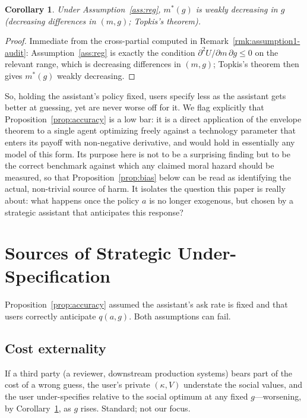 \documentclass[11pt]{article}
\newtheorem{corollary}{Corollary}
\begin{document}
\begin{corollary}\label{cor:mono}
Under Assumption~\ref{ass:reg}, $m^*(g)$ is weakly decreasing in $g$ (decreasing
differences in $(m,g)$; Topkis's theorem).
\end{corollary}

\begin{proof}
Immediate from the cross-partial computed in Remark~\ref{rmk:assumption1-audit}:
Assumption~\ref{ass:reg} is exactly the condition $\partial^2U/\partial m\,\partial g \le 0$
on the relevant range, which is decreasing differences in $(m,g)$; Topkis's
theorem then gives $m^*(g)$ weakly decreasing.
\end{proof}

So, holding the assistant's policy fixed, users specify less as the assistant gets
better at guessing, yet are never worse off for it. We flag explicitly that
Proposition~\ref{prop:accuracy} is a low bar: it is a direct application of the
envelope theorem to a single agent optimizing freely against a technology
parameter that enters its payoff with non-negative derivative, and would hold in
essentially any model of this form. Its purpose here is not to be a surprising
finding but to be the correct benchmark against which any claimed moral hazard
should be measured, so that Proposition~\ref{prop:bias} below can be read as
identifying the actual, non-trivial source of harm. It isolates the
question this paper is really about: what happens once the policy $a$ is no longer
exogenous, but chosen by a strategic assistant that anticipates this response?

\section{Sources of Strategic Under-Specification}

Proposition~\ref{prop:accuracy} assumed the assistant's ask rate is fixed and that
users correctly anticipate $q(a,g)$. Both assumptions can fail.

\subsection{Cost externality}
If a third party (a reviewer, downstream production systems) bears part of the
cost of a wrong guess, the user's private $(\kappa, V)$ understate the social
values, and the user under-specifies relative to the social optimum at any fixed
$g$---worsening, by Corollary~\ref{cor:mono}, as $g$ rises. Standard; not our focus.
\end{document}
